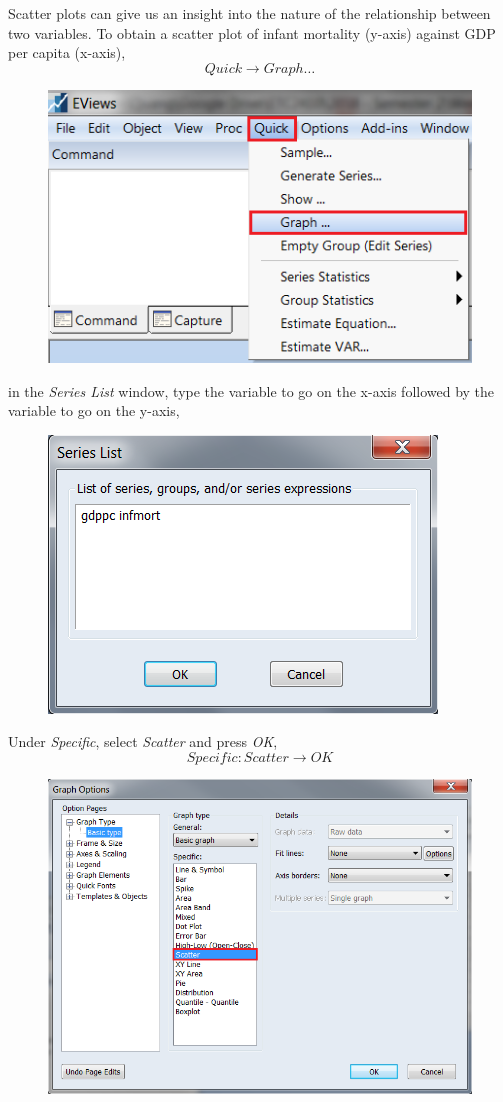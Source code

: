 \documentclass[12pt]{report}
\begin{document}
\noindent Scatter plots can give us an insight into the nature of the relationship between two variables. To obtain a scatter plot of infant mortality (y-axis) against GDP per capita (x-axis),
$$Quick \to Graph \dots$$
\begin{figure}[H]
	\centerline{\includegraphics{2018sem2_q1_5}}
\end{figure}
\vspace{-\baselineskip} \noindent in the \textit{Series List} window, type the variable to go on the x-axis followed by the variable to go on the y-axis,
\begin{figure}[H]
	\centerline{\includegraphics{2018sem2_q1_6}}
\end{figure}
\vspace{-\baselineskip} \noindent Under \textit{Specific}, select \textit{Scatter} and press \textit{OK},
$$Specific:Scatter \to OK$$
\begin{figure}[H]
	\centerline{\includegraphics{scat3}}
\end{figure}
\end{document}
